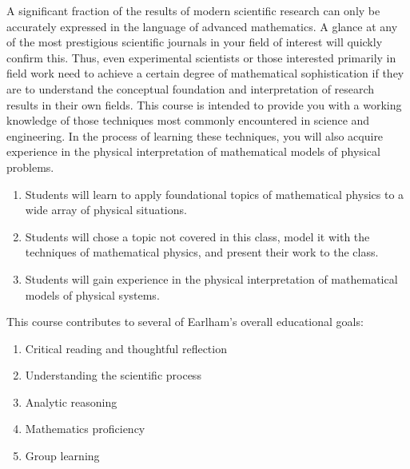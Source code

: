 \documentclass[12pt]{article}
\begin{document}
\begin{description}
        A significant
        fraction of the results of modern scientific research can only be
        accurately expressed in the language of advanced mathematics. A glance
        at any of the most prestigious scientific journals in your field of
        interest will quickly confirm this. Thus, even experimental scientists
        or those interested primarily in field work need to achieve a certain
        degree of mathematical sophistication if they are to understand the
        conceptual foundation and interpretation of research results in their
        own fields. This course is intended to provide you with a working
        knowledge of those techniques most commonly encountered in science and
        engineering. In the process of learning these techniques, you will
        also acquire experience in the physical interpretation of mathematical
        models of physical problems. \ \\\vspace{-.3in}

        \begin{enumerate}
          \item Students will learn to apply foundational topics of mathematical physics to a wide array of physical situations.
          \item Students will chose a topic not covered in this class, model it with the techniques of mathematical physics, and present their work to the class.
          \item Students will gain experience in the physical interpretation of mathematical models of physical systems.
        \end{enumerate}

        This course contributes to several of Earlham's overall educational goals: \ \\\vspace{-.3in}
        \begin{enumerate}
          \item Critical reading and thoughtful reflection
          \item Understanding the scientific process
          \item Analytic reasoning
          \item Mathematics proficiency
          \item Group learning
        \end{enumerate}
        
\end{description}       
\end{document}
